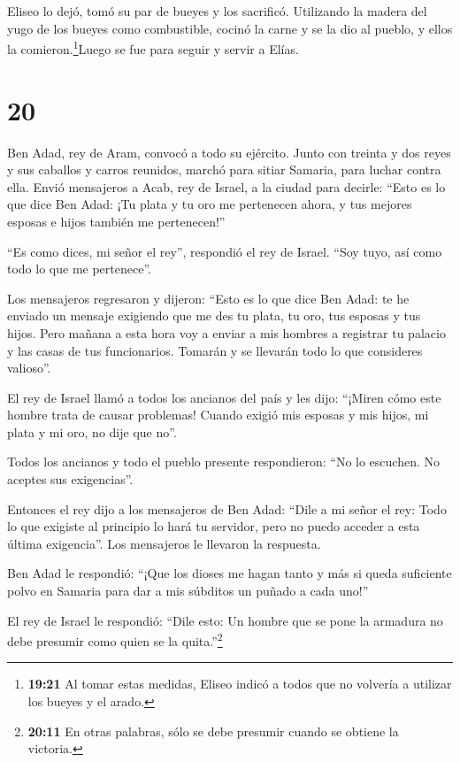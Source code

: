  Eliseo lo dejó, tomó su par de bueyes y los sacrificó.
Utilizando la madera del yugo de los bueyes como combustible, cocinó la
carne y se la dio al pueblo, y ellos la comieron.\footnote{\textbf{19:21}
  Al tomar estas medidas, Eliseo indicó a todos que no volvería a
  utilizar los bueyes y el arado.}Luego se fue para seguir y servir a
Elías.

\hypertarget{section-19}{%
\section{20}\label{section-19}}

 Ben Adad, rey de Aram, convocó a todo su ejército. Junto
con treinta y dos reyes y sus caballos y carros reunidos, marchó para
sitiar Samaria, para luchar contra ella.  Envió mensajeros a
Acab, rey de Israel, a la ciudad para decirle: ``Esto es lo que dice Ben
Adad:  ¡Tu plata y tu oro me pertenecen ahora, y tus mejores
esposas e hijos también me pertenecen!''

 ``Es como dices, mi señor el rey'', respondió el rey de
Israel. ``Soy tuyo, así como todo lo que me pertenece''.

 Los mensajeros regresaron y dijeron: ``Esto es lo que dice
Ben Adad: te he enviado un mensaje exigiendo que me des tu plata, tu
oro, tus esposas y tus hijos.  Pero mañana a esta hora voy a
enviar a mis hombres a registrar tu palacio y las casas de tus
funcionarios. Tomarán y se llevarán todo lo que consideres valioso''.

 El rey de Israel llamó a todos los ancianos del país y les
dijo: ``¡Miren cómo este hombre trata de causar problemas! Cuando exigió
mis esposas y mis hijos, mi plata y mi oro, no dije que no''.

 Todos los ancianos y todo el pueblo presente respondieron:
``No lo escuchen. No aceptes sus exigencias''.

 Entonces el rey dijo a los mensajeros de Ben Adad: ``Dile a
mi señor el rey: Todo lo que exigiste al principio lo hará tu servidor,
pero no puedo acceder a esta última exigencia''. Los mensajeros le
llevaron la respuesta.

 Ben Adad le respondió: ``¡Que los dioses me hagan tanto y
más si queda suficiente polvo en Samaria para dar a mis súbditos un
puñado a cada uno!''

 El rey de Israel le respondió: ``Dile esto: Un hombre que
se pone la armadura no debe presumir como quien se la
quita.''\footnote{\textbf{20:11} En otras palabras, sólo se debe
  presumir cuando se obtiene la victoria.}

